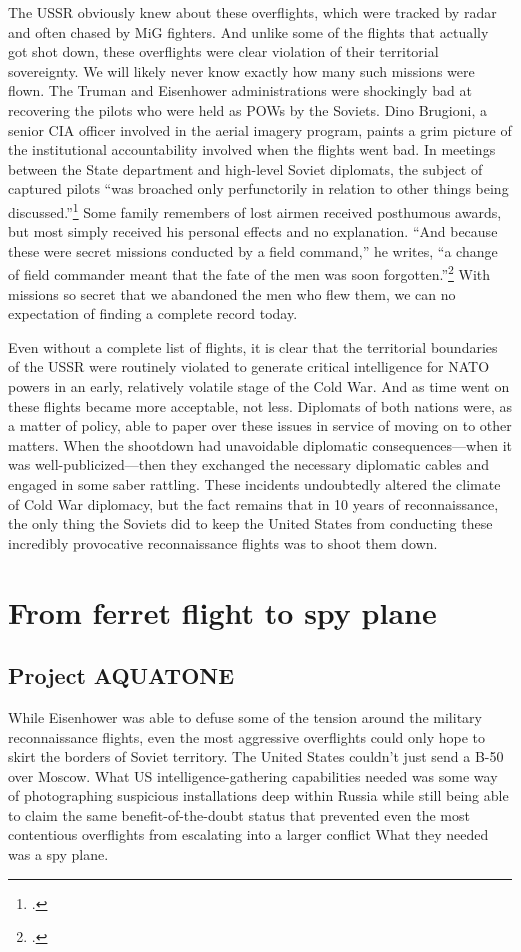 \documentclass[12pt]{article}
\begin{document}
The USSR obviously knew about these overflights, which were tracked by radar and often chased by MiG fighters. And unlike some of the flights that actually got shot down, these overflights were clear violation of their territorial sovereignty. We will likely never know exactly how many such missions were flown. The Truman and Eisenhower administrations were shockingly bad at recovering the pilots who were held as POWs by the Soviets. Dino Brugioni, a senior CIA officer involved in the aerial imagery program, paints a grim picture of the institutional accountability involved when the flights went bad. In meetings between the State department and high-level Soviet diplomats, the subject of captured pilots ``was broached only perfunctorily in relation to other things being discussed.''\footcite[p.~72]{brugioni_eyes_2010} Some family remembers of lost airmen received posthumous awards, but most simply received his personal effects and no explanation. ``And because these were secret missions conducted by a field command,'' he writes, ``a change of field commander meant that the fate of the men was soon forgotten.''\footcite[p.~72]{brugioni_eyes_2010} With missions so secret that we abandoned the men who flew them, we can no expectation of finding a complete record today.

Even without a complete list of flights, it is clear that the territorial boundaries of the USSR were routinely violated to generate critical intelligence for NATO powers in an early, relatively volatile stage of the Cold War. And as time went on these flights became more acceptable, not less. Diplomats of both nations were, as a matter of policy, able to paper over these issues in service of moving on to other matters. When the shootdown had unavoidable diplomatic consequences---when it was well-publicized---then they exchanged the necessary diplomatic cables and engaged in some saber rattling. These incidents undoubtedly altered the climate of Cold War diplomacy, but the fact remains that in 10 years of reconnaissance, the only thing the Soviets did to keep the United States from conducting these incredibly provocative reconnaissance flights was to shoot them down.

\section{From ferret flight to spy plane}
\subsection{Project AQUATONE}
While Eisenhower was able to defuse some of the tension around the military reconnaissance flights, even the most aggressive overflights could only hope to skirt the borders of Soviet territory. The United States couldn't just send a B-50 over Moscow. What US intelligence-gathering capabilities needed was some way of photographing suspicious installations deep within Russia while still being able to claim the same benefit-of-the-doubt status that prevented even the most contentious overflights from escalating into a larger conflict What they needed was a spy plane.
\end{document}
